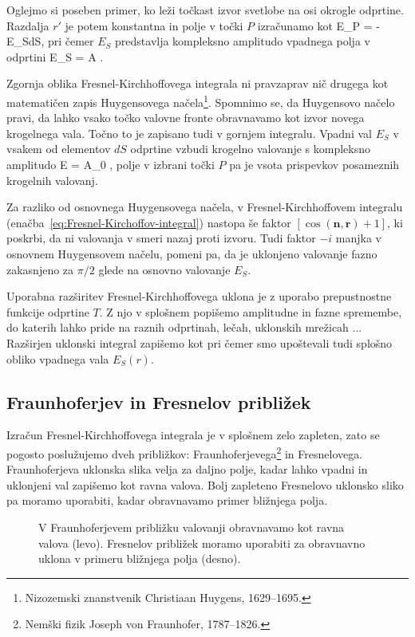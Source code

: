 Oglejmo si poseben primer, ko leži točkast izvor svetlobe na osi okrogle odprtine. Razdalja
$r'$ je potem konstantna in polje v točki $P$ izračunamo kot 
\beq
\label{eq:Fresnelov-uklon}
E_P =  - \int E_S dS,
\eeq
pri čemer $E_S$ predstavlja kompleksno amplitudo vpadnega polja v odprtini
\beq
E_S = A .
\eeq 

Zgornja oblika Fresnel-Kirchhoffovega integrala ni pravzaprav nič drugega kot 
matematičen zapis Huygensovega 
načela\footnote{Nizozemski znanstvenik Christiaan Huygens, 1629--1695.}. 
Spomnimo se, da Huygensovo načelo pravi, da lahko vsako točko valovne fronte obravnavamo 
kot izvor novega krogelnega vala. Točno to je zapisano tudi v gornjem integralu. Vpadni val
$E_S$ v vsakem od elementov $dS$ odprtine vzbudi krogelno valovanje s
kompleksno amplitudo
\beq
E = A_0 ,
\eeq 
polje v izbrani točki $P$ pa je vsota prispevkov posameznih krogelnih valovanj.

Za razliko od osnovnega Huygensovega načela, v Fresnel-Kirchhoffovem integralu 
(enačba~\ref{eq:Fresnel-Kirchoffov-integral})
nastopa še faktor $\left[\cos(\mathbf{n},\mathbf{r})+1\right]$, ki poskrbi, da ni valovanja 
v smeri nazaj proti izvoru. Tudi faktor $-i$ manjka v osnovnem Huygensovem načelu,
pomeni pa, da je uklonjeno valovanje fazno zakasnjeno za $\pi/2$ glede na osnovno
valovanje $E_S$.

Uporabna razširitev Fresnel-Kirchhoffovega uklona je z uporabo prepustnostne funkcije odprtine $T$.
Z njo v splošnem popišemo amplitudne in fazne spremembe, do katerih lahko pride na raznih 
odprtinah, lečah, uklonskih mrežicah ... Razširjen uklonski integral zapišemo kot
pri čemer smo upoštevali tudi splošno obliko vpadnega vala $E_S(r)$.

\subsection*{Fraunhoferjev in Fresnelov približek}
\label{FFuklon}
Izračun Fresnel-Kirchhoffovega integrala je v splošnem zelo zapleten, zato se 
pogosto poslužujemo dveh približkov: Fraunhoferjevega\footnote{Nemški fizik 
Joseph von Fraunhofer, 1787--1826.} in Fresnelovega. 
Fraunhoferjeva uklonska slika velja za daljno polje, kadar lahko 
vpadni in uklonjeni val zapišemo kot ravna valova. Bolj zapleteno Fresnelovo uklonsko sliko pa moramo
uporabiti, kadar obravnavamo primer bližnjega polja. 
\begin{figure}[h]
\centering {} 
  
\caption{V Fraunhoferjevem približku valovanji obravnavamo kot ravna valova 
(levo). Fresnelov približek moramo uporabiti za obravnavno uklona v primeru bližnjega polja (desno).}
\label{fig:UklonFF}
\end{figure}


